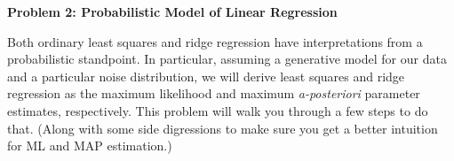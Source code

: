 \documentclass{article}\usepackage[utf8]{inputenc}\usepackage[margin=0.4cm,top=0.4cm,bottom=0.4cm]{geometry}\usepackage[usenames,dvipsnames,svgnames,table]{xcolor}
\begin{document}
\vspace{-2mm}\noindent\begin{mybox}{\begin{center}\textbf{\color{black}Problem 2: Probabilistic Model of Linear Regression}\end{center}}\end{mybox}\vspace{-2mm}
\vspace{10pt}
\noindent Both ordinary least squares and ridge regression have interpretations from a probabilistic standpoint. In particular, assuming a generative model for our data and a particular noise distribution, we will derive least squares and ridge regression as the maximum likelihood and maximum {\em a-posteriori} parameter estimates, respectively. This problem will walk you through a few steps to do that. (Along with some side digressions to make sure you get a better intuition for ML and MAP estimation.)  
\end{document}
